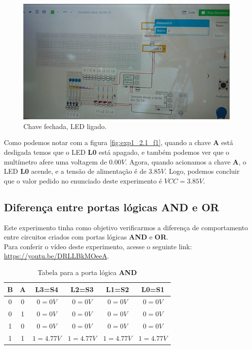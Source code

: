 \documentclass[12pt]{article}
\begin{document}
\begin{figure}[H]
    \centering
    \includegraphics[width=.9\textwidth]{exp1_2.1_f2.png}
    \caption{Chave fechada, LED ligado.}
    \label{fig:exp1_2.1_f2}
\end{figure}

Como podemos notar com a figura \ref{fig:exp1_2.1_f1}, quando a chave \textbf{A}
está desligada temos que o LED \textbf{L0} está apagado, e também podemos ver
que o multímetro afere uma voltagem de \( 0.00V \). Agora, quando acionamos a
chave \textbf{A}, o LED \textbf{L0} acende, e a tensão de alimentação é de
\( 3.85V \). Logo, podemos concluir que o valor pedido no enunciado deste
experimento é \( VCC = 3.85V \).
\\[2em]

\subsection{Diferença entre portas lógicas \textbf{AND} e \textbf{OR}}
\label{sec:and_e_or}

Este experimento tinha como objetivo verificarmos a diferença de comportamento
entre circuitos criados com portas lógicas \textbf{AND} e \textbf{OR}.\\
Para conferir o vídeo deste experimento, acesse o seguinte link:
\href{https://youtu.be/DRLLBkMOeeA}{https://youtu.be/DRLLBkMOeeA}.

\begin{table}[H]
    \centering
    \caption{Tabela para a porta lógica \textbf{AND}}
    \begin{tabular}{|c|c|c|c|c|c|}
    \hline
    \textbf{B} & \textbf{A} & \textbf{L3}=S4 & \textbf{L2}=S3 & \textbf{L1}=S2 & \textbf{L0}=S1 \\
    \hline
    0  & 0 & \(0 = 0V\) & \(0 = 0V\) & \(0 = 0V\) & \(0 = 0V\) \\
    \hline
    0  & 1 & \(0 = 0V\) & \(0 = 0V\) & \(0 = 0V\) & \(0 = 0V\) \\
    \hline
    1  & 0 & \(0 = 0V\) & \(0 = 0V\) & \(0 = 0V\) & \(0 = 0V\) \\
    \hline
    1  & 1 & \(1 = 4.77V\) & \(1 = 4.77V\) & \(1 = 4.77V\) & \(1 = 4.77V\) \\
    \hline
    \end{tabular}
    \label{tab:tabela_and}
\end{table}
\end{document}
